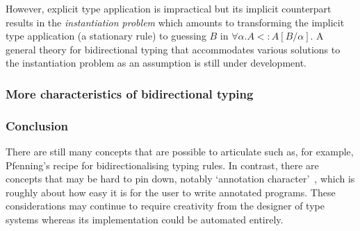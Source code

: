 However, explicit type application is impractical but its implicit counterpart results in the \emph{instantiation problem} which amounts to transforming the implicit type application (a stationary rule) to guessing $B$ in $\forall \alpha. A <: A[B/\alpha]$.
A general theory for bidirectional typing that accommodates various solutions to the instantiation problem as an assumption is still under development.

\subsubsection{More characteristics of bidirectional typing}

\subsubsection{Conclusion}
There are still many concepts that are possible to articulate such as, for example, Pfenning's recipe for bidirectionalising typing rules.
In contrast, there are concepts that may be hard to pin down, notably `annotation character'~\cite{Dunfield2021}, which is roughly about how easy it is for the user to write annotated programs.
These considerations may continue to require creativity from the designer of type systems whereas its implementation could be automated entirely.
